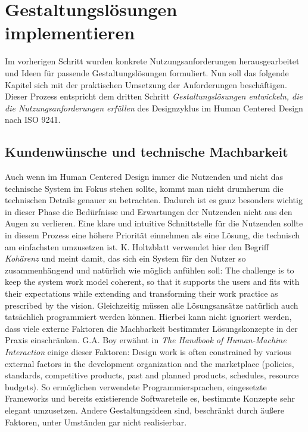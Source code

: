 \chapter{Gestaltungslösungen implementieren}
\label{chapter:implementation}

Im vorherigen Schritt wurden konkrete Nutzungsanforderungen herausgearbeitet
und Ideen für passende Gestaltungslösungen formuliert. Nun soll das folgende
Kapitel sich mit der praktischen Umsetzung der Anforderungen beschäftigen.
Dieser Prozess entspricht dem dritten Schritt \textit{Gestaltungslösungen
    entwickeln, die die Nutzungsanforderungen erfüllen} des Designzyklus im Human
Centered Design nach ISO 9241\cite{ISO9241}.

\section{Kundenwünsche und technische Machbarkeit}
Auch wenn im Human Centered Design immer die Nutzenden und nicht das technische
System im Fokus stehen sollte, kommt man nicht drumherum die technischen
Details genauer zu betrachten. Dadurch ist es ganz besonders wichtig in dieser
Phase die Bedürfnisse und Erwartungen der Nutzenden nicht aus den Augen zu
verlieren. Eine klare und intuitive Schnittstelle für die Nutzenden sollte in
diesem Prozess eine höhere Priorität einnehmen als eine Lösung, die technisch
am einfachsten umzusetzen ist. K. Holtzblatt verwendet hier den Begriff
\textit{Kohärenz} und meint damit, das sich ein System für den Nutzer so
zusammenhängend und natürlich wie möglich anfühlen soll: \glqq{}The challenge
is to keep the system work model coherent, so that it supports the users and
fits with their expectations while extending and transforming their work
practice as prescribed by the vision.\grqq{}\cite{contextualDesign}
Gleichzeitig müssen alle Lösungsansätze natürlich auch tatsächlich programmiert
werden können. Hierbei kann nicht ignoriert werden, dass viele externe Faktoren
die Machbarkeit bestimmter Lösungskonzepte in der Praxis einschränken. G.A. Boy
erwähnt in \textit{The Handbook of Human-Machine Interaction} einige dieser
Faktoren: \glqq{}Design work is often constrained by various external factors
in the development organization and the marketplace (policies, standards,
competitive products, past and planned products, schedules, resource
budgets).\grqq\cite{HMI-HCD} So ermöglichen verwendete Programmiersprachen,
eingesetzte Frameworks und bereits existierende Softwareteile es, bestimmte
Konzepte sehr elegant umzusetzen. Andere Gestaltungsideen sind, beschränkt
durch äußere Faktoren, unter Umständen gar nicht realisierbar\cite{HMI-HCD}.

